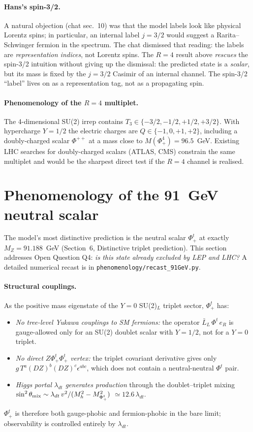 \documentclass[11pt,a4paper]{article}
\begin{document}
\paragraph{Hans's spin-3/2.} A natural objection (chat sec.~10) was that
the model labels look like physical Lorentz spins; in particular, an
internal label $j = 3/2$ would suggest a Rarita--Schwinger fermion in the
spectrum. The chat dismissed that reading: the labels are
\emph{representation indices}, not Lorentz spins. The $R = 4$ result
above \emph{rescues} the spin-3/2 intuition without giving up the
dismissal: the predicted state is a \emph{scalar}, but its mass is fixed
by the $j = 3/2$ Casimir of an internal channel. The spin-3/2 ``label''
lives on as a representation tag, not as a propagating spin.

\paragraph{Phenomenology of the $R=4$ multiplet.} The 4-dimensional
SU(2) irrep contains $T_3 \in \{-3/2, -1/2, +1/2, +3/2\}$. With
hypercharge $Y = 1/2$ the electric charges are $Q \in \{-1, 0, +1, +2\}$,
including a doubly-charged scalar $\Phi^{++}$ at a mass close to
$M(\Phi^4_+) = 96.5$~GeV. Existing LHC searches for doubly-charged
scalars (ATLAS, CMS) constrain the same multiplet and would be the
sharpest direct test if the $R = 4$ channel is realised.

\section{Phenomenology of the 91~GeV neutral scalar}
\label{sec:91GeV}

The model's most distinctive prediction is the neutral scalar
$\Phi^t_+$ at exactly $M_Z = 91.188$~GeV (Section~6, Distinctive triplet
prediction). This section addresses Open Question Q4: \emph{is this state
already excluded by LEP and LHC?} A detailed numerical recast is in
\texttt{phenomenology/recast\_91GeV.py}.

\paragraph{Structural couplings.} As the positive mass eigenstate of the
$Y=0$ SU(2)$_L$ triplet sector, $\Phi^t_+$ has:
\begin{itemize}
\item \emph{No tree-level Yukawa couplings to SM fermions:} the operator
  $\bar L_L\, \Phi^t\, e_R$ is gauge-allowed only for an SU(2) doublet
  scalar with $Y = 1/2$, not for a $Y=0$ triplet.
\item \emph{No direct $Z\Phi^t_+\Phi^t_+$ vertex:} the triplet covariant
  derivative gives only $g\, T^a (D Z)^b (D Z)^c \epsilon^{abc}$, which
  does not contain a neutral-neutral $\Phi^t$ pair.
\item \emph{Higgs portal $\lambda_{dt}$ generates production} through
  the doublet--triplet mixing $\sin^2\theta_{\rm mix} \sim \lambda_{dt}\,v^2 / (M_h^2 - M_{\Phi^t_+}^2)$
  $\simeq 12.6\,\lambda_{dt}$.
\end{itemize}
$\Phi^t_+$ is therefore both gauge-phobic and fermion-phobic in the bare
limit; observability is controlled entirely by $\lambda_{dt}$.
\end{document}
